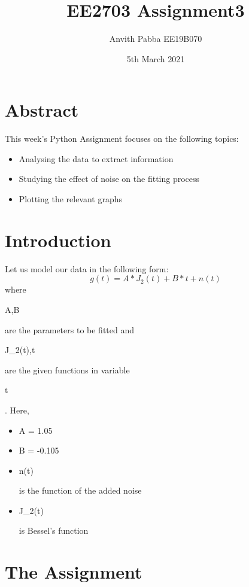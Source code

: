 \documentclass[11pt]{article}
\title{EE2703 Assignment3}
\author{Anvith Pabba EE19B070}
\date{5th March 2021}
\begin{document}
\maketitle

\section{Abstract}
This week's Python Assignment focuses on the following topics:
\begin{itemize}
    \item Analysing the data to extract information
    \item Studying the effect of noise on the fitting process
    \item Plotting the relevant graphs
\end{itemize}


\section{Introduction}
Let us model our data in the following form:
\begin{equation*}
g(t) = A*J_2(t) +B*t +n(t)
\end{equation*}
where \begin{textit}A,B\end{textit} are the parameters to be fitted and \begin{textit}J_2(t),t\end{textit} are the given functions in variable \begin{textit}t\end{textit}.
Here,
\begin{itemize}
    \item \begin{textit}A = 1.05\end{textit}
    \item \begin{textit}B = -0.105\end{textit}
    \item \begin{textit}n(t)\end{textit} is the function of the added noise
    \item \begin{textit}J_2(t)\end{textit} is Bessel's function
\end{itemize}

\section{The Assignment}
\end{document}
